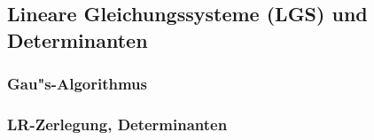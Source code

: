 
%


%
%
%

\subsection{Lineare Gleichungssysteme (LGS) und Determinanten}

\subsubsection{Gau"s-Algorithmus}



\subsubsection{LR-Zerlegung, Determinanten}



